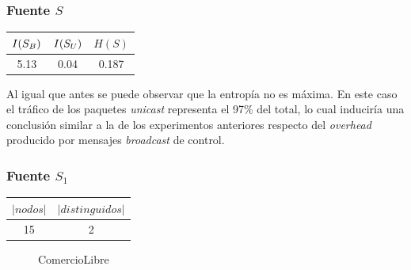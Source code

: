 \subsubsection{Fuente $S$}

\begin{center}\small
	\begin{tabular}{ c | c | c }
	  $I(S_{B})$ & $I(S_{U})$ & $H(S)$ \\
	  \hline
	  5.13 & 0.04 & 0.187 \\
	\end{tabular}
\end{center}

Al igual que antes se puede observar que la entropía no es máxima. En este caso el tráfico de los paquetes \textit{unicast} representa el 97\% del total, lo cual induciría una conclusión similar a la de los experimentos anteriores respecto del \textit{overhead} producido por mensajes \textit{broadcast} de control.

\medskip

\subsubsection{Fuente $S_1$}

\begin{center}\small
	\begin{tabular}{ c | c }
	  $|nodos|$ & $|distinguidos|$ \\
	  \hline
	 15 & 2 \\
	\end{tabular}
\end{center}

\begin{figure}[H]
	\centering
	\caption{ComercioLibre}
	
    \label{grafo_ecommerce}
\end{figure}

